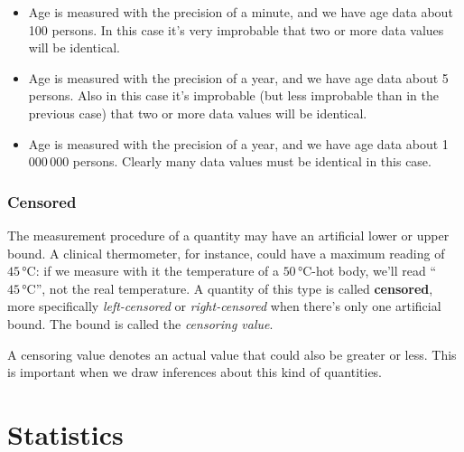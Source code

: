 \documentclass[
  a4paper,
  DIV=11,
  numbers=noendperiod,
  oneside]{scrreprt}
\begin{document}
\begin{itemize}
\item
  Age is measured with the precision of a minute, and we have age data
  about 100 persons. In this case it's very improbable that two or more
  data values will be identical.
\item
  Age is measured with the precision of a year, and we have age data
  about 5 persons. Also in this case it's improbable (but less
  improbable than in the previous case) that two or more data values
  will be identical.
\item
  Age is measured with the precision of a year, and we have age data
  about 1\,000\,000 persons. Clearly many data values must be identical
  in this case.
\end{itemize}

\hypertarget{censored}{%
\subsection{Censored}\label{censored}}

The measurement procedure of a quantity may have an artificial lower or
upper bound. A clinical thermometer, for instance, could have a maximum
reading of \(45\,\mathrm{°C}\): if we measure with it the temperature of
a \(50\,\mathrm{°C}\)-hot body, we'll read {``\(45\,\mathrm{°C}\)'',}
not the real temperature. A quantity of this type is called
{\textbf{censored}}, more specifically \emph{left-censored} or
\emph{right-censored} when there's only one artificial bound. The bound
is called the \emph{censoring value}.

A censoring value denotes an actual value that could also be greater or
less. This is important when we draw inferences about this kind of
quantities.

\hypertarget{statistics}{%
\chapter{Statistics}\label{statistics}}

\providecommand{\ul}{\uline}
\renewcommand*{\|}[1][]{\nonscript\:#1\vert\nonscript\:\mathopen{}}
\providecommand*{\pr}[1]{\textsf{\small`#1'}}
\renewcommand*{\pr}[1]{\textsf{\small`#1'}}
\providecommand*{\prq}[1]{\textsf{\small #1}}
\renewcommand*{\prq}[1]{\textsf{\small #1}}
\providecommand{\se}[1]{\mathsfit{#1}}
\renewcommand{\se}[1]{\mathsfit{#1}}
\providecommand{\p}{\mathrm{p}}
\renewcommand{\p}{\mathrm{p}}
\renewcommand{\P}{\mathrm{P}}
\end{document}

